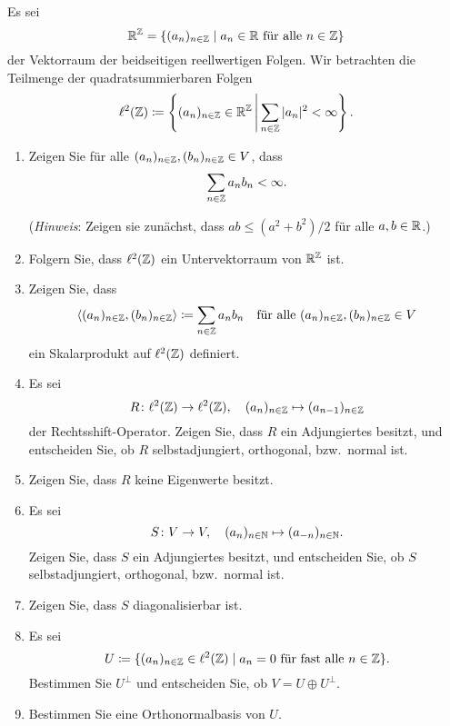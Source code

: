 \begin{question}[subtitle = Beispiele und Gegenbeispiele auf $\ell^2(\Zbb)$]{2}
  \label{qst: counterexample sequences}
  Es sei
  \[
    \mathbb{R}^{\mathbb{Z}} = \{(a_n)_{n \in \mathbb{Z}} \mid \text{$a_n \in \mathbb{R}$ für alle $n \in \mathbb{Z}$}\}
  \]
  der Vektorraum der beidseitigen reellwertigen Folgen.
  Wir betrachten die Teilmenge der quadratsummierbaren Folgen
  \[
    \ell^2(\mathbb{Z}) \coloneqq
    \left\{
      (a_n)_{n \in \mathbb{Z}} \in \mathbb{R}^{\mathbb{Z}}
    \,\middle|\,
      \sum_{n \in \mathbb{Z}} |a_n|^2 < \infty
   \right\}.
  \]
  \begin{enumerate}[leftmargin=*]
    \item
      Zeigen Sie für alle $(a_n)_{n \in \mathbb{Z}}, (b_n)_{n \in \mathbb{Z}} \in V$, dass
      \[
        \sum_{n \in \mathbb{Z}} a_n b_n < \infty.
      \]
      
      (\emph{Hinweis}:
       Zeigen sie zunächst, dass $ab \leq (a^2 + b^2)/2$ für alle $a, b \in \mathbb{R}$.)
    \item
      Folgern Sie, dass $\ell^2(\Zbb)$ ein Untervektorraum von $\mathbb{R}^{\mathbb{Z}}$ ist.
    \item
      Zeigen Sie, dass
      \[
                  \left\langle  (a_n)_{n \in \mathbb{Z}}, (b_n)_{n \in \mathbb{Z}}  \right\rangle
        \coloneqq \sum_{n \in \mathbb{Z}} a_n b_n
        \quad
        \text{für alle $(a_n)_{n \in \mathbb{Z}}, (b_n)_{n \in \mathbb{Z}} \in V$}
      \]
      ein Skalarprodukt auf $\ell^2(\Zbb)$ definiert.
    \item
      Es sei
      \[
        R \colon \ell^2(\mathbb{Z}) \to \ell^2(\mathbb{Z}),
        \quad
        (a_n)_{n \in \mathbb{Z}} \mapsto (a_{n-1})_{n \in \mathbb{Z}}
      \]
      der Rechtsshift-Operator.
      Zeigen Sie, dass $R$ ein Adjungiertes besitzt, und entscheiden Sie, ob $R$ selbstadjungiert, orthogonal, bzw.\ normal ist.
    \item
      Zeigen Sie, dass $R$ keine Eigenwerte besitzt.
    \item
      Es sei
      \[
        S \colon V \to V,
        \quad
        (a_n)_{n \in \mathbb{N}} \mapsto (a_{-n})_{n \in \mathbb{N}}.
      \]
      Zeigen Sie, dass $S$ ein Adjungiertes besitzt, und entscheiden Sie, ob $S$ selbstadjungiert, orthogonal, bzw.\ normal ist.
    \item
      Zeigen Sie, dass $S$ diagonalisierbar ist.
    \item
      Es sei
      \[
        U \coloneqq \{(a_n)_{n \in \mathbb{Z}} \in \ell^2(\mathbb{Z}) \mid \text{$a_n = 0$ für fast alle $n \in \mathbb{Z}$}\}.
      \]
      Bestimmen Sie $U^\perp$ und entscheiden Sie, ob $V = U \oplus U^\perp$.
    \item
      Bestimmen Sie eine Orthonormalbasis von $U$.
  \end{enumerate}
\end{question}


